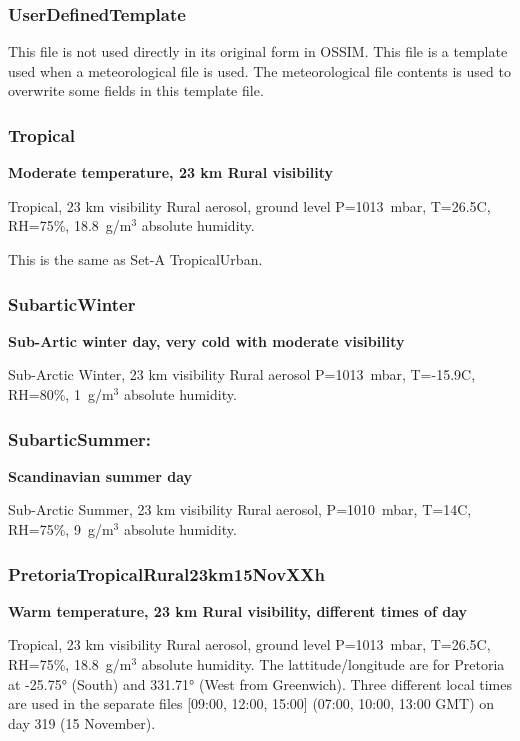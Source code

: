 \documentclass{workpackage}
\begin{document}
\subsubsection{UserDefinedTemplate}
\label{sec:UserDefinedTemplate}

This file is not used directly in its original form in OSSIM. This file is a template used when a meteorological file is used. The meteorological file contents is used to overwrite some fields in this template file.

\subsubsection{Tropical}
\label{sec:Tropical}

\textbf{Moderate temperature, 23 km Rural visibility}

Tropical, 23 km visibility  Rural aerosol, ground level P=1013~mbar, T=26.5C, RH=75\%, 18.8~g/m$^3$ absolute humidity.

This is the same as Set-A TropicalUrban.

\subsubsection{SubarticWinter}
\label{sec:SubarticWinter}

\textbf{Sub-Artic winter day, very cold with moderate visibility}

Sub-Arctic Winter, 23 km visibility  Rural aerosol
 P=1013~mbar, T=-15.9C, RH=80\%, 1~g/m$^3$ absolute humidity.

\subsubsection{SubarticSummer:}
\label{sec:SubarticSummer}

\textbf{Scandinavian summer day }

Sub-Arctic Summer, 23 km visibility  Rural  aerosol, P=1010~mbar, T=14C, RH=75\%, 9~g/m$^3$ absolute humidity.


\subsubsection{PretoriaTropicalRural23km15NovXXh}
\label{sec:PretoriaTropicalRural23km15NovXXh}

\textbf{Warm temperature, 23 km Rural visibility, different times of day}

Tropical, 23 km visibility  Rural aerosol, ground level P=1013~mbar, T=26.5C, RH=75\%, 18.8~g/m$^3$ absolute humidity.
The lattitude/longitude are for Pretoria at  -25.75\si{\degree} (South) and 331.71\si{\degree} (West from Greenwich).
Three different local times are used in the separate files [09:00, 12:00, 15:00] (07:00, 10:00, 13:00 GMT) on day 319 (15 November).
\end{document}
